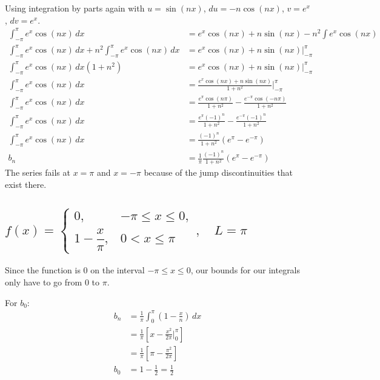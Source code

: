 \documentclass[11pt]{article}
\begin{document}
    Using integration by parts again with $u=\sin(nx)$, $du=-n\cos(nx)$, $v=e^x$, $dv=e^x$.
    \begin{align*}
        \int_{-\pi}^{\pi} e^x \cos(nx) \,dx &= e^x \cos(nx) + n \sin(nx) - n^2 \int e^x \cos(nx)\\
        \int_{-\pi}^{\pi} e^x \cos(nx) \,dx +  n^2 \int_{-\pi}^{\pi} e^x \cos(nx) \,dx &= e^x \cos(nx) + n \sin(nx) \Big|_{-\pi}^{\pi} \\
        \int_{-\pi}^{\pi} e^x \cos(nx) \,dx (1+n^2) &= e^x \cos(nx) + n \sin(nx) \Big|_{-\pi}^{\pi}\\
        \int_{-\pi}^{\pi} e^x \cos(nx) \,dx &= \frac{ e^x \cos(nx) + n \sin(nx)}{1+n^2} \Big|_{-\pi}^{\pi}\\
        \int_{-\pi}^{\pi} e^x \cos(nx) \,dx &= \frac{e^{\pi}  \cos(n \pi)}{1+n^2} - \frac{e^{-\pi}  \cos(-n \pi)}{1+n^2}\\
        \int_{-\pi}^{\pi} e^x \cos(nx) \,dx &= \frac{e^{\pi}  (-1)^n}{1+n^2} - \frac{e^{-\pi} (-1)^n}{1+n^2}\\
        \int_{-\pi}^{\pi} e^x \cos(nx) \,dx &= \frac{(-1)^n}{1+n^2} (e^{\pi} - e^{-\pi})\\
        b_n &= \frac{1}{\pi}\frac{(-1)^n}{1+n^2} (e^{\pi} - e^{-\pi})
    \end{align*}
    The series fails at $x=\pi$ and $x = -\pi$ because of the jump discontinuities that exist there.

    \subsection{
        $f(x)=
        \begin{cases}
            0, & -\pi \le x \le 0, \\
            1-\dfrac{x}{\pi}, & 0 < x \le \pi
        \end{cases},
        \quad L=\pi$
    }

    Since the function is $0$ on the interval $-\pi \le x \le 0$, our bounds for our integrals only
    have to go from $0$ to $\pi$.

    For $b_0$:
    \begin{align*}
        b_n &= \frac{1}{\pi} \int_0^{\pi} (1-\frac{x}{n}) \,dx\\
        &=  \frac{1}{\pi} \left[ x-\frac{x^2}{2\pi} \Big|_0^{\pi} \right]\\
        &= \frac{1}{\pi} \left[ \pi - \frac{\pi^2}{2\pi} \right] \\
        b_0 &= 1 - \frac{1}{2} = \frac{1}{2}
    \end{align*}
\end{document}
